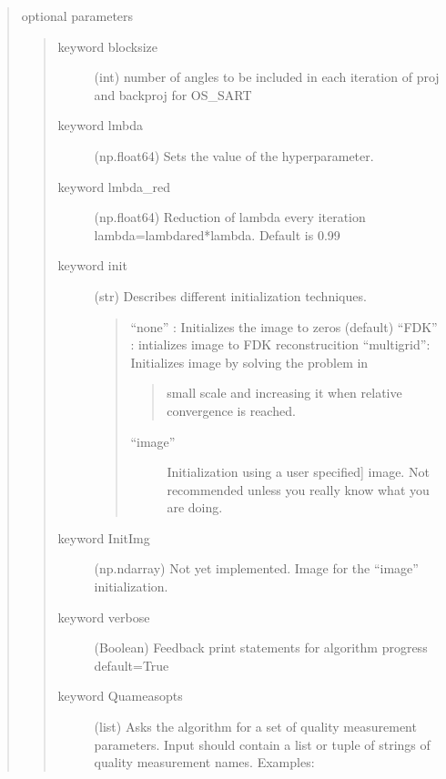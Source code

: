 \documentclass[letterpaper,10pt,english]{sphinxmanual}
\begin{document}
\begin{fulllineitems}
\begin{quote}
\begin{quote}
\begin{description}
\end{description}\end{quote}

optional parameters
\begin{quote}\begin{description}
\item[{keyword blocksize}] \leavevmode
(int)
number of angles to be included in each iteration
of proj and backproj for OS\_SART

\item[{keyword lmbda}] \leavevmode
(np.float64)
Sets the value of the hyperparameter.

\item[{keyword lmbda\_red}] \leavevmode
(np.float64)
Reduction of lambda every iteration
lambda=lambdared*lambda. Default is 0.99

\item[{keyword init}] \leavevmode
(str)
Describes different initialization techniques.
\begin{quote}

“none”     : Initializes the image to zeros (default)
“FDK”      : intializes image to FDK reconstrucition
“multigrid”: Initializes image by solving the problem in
\begin{quote}

small scale and increasing it when relative
convergence is reached.
\end{quote}
\begin{description}
\item[{“image”}] \leavevmode{[}Initialization using a user specified{]}
image. Not recommended unless you really
know what you are doing.

\end{description}
\end{quote}

\item[{keyword InitImg}] \leavevmode
(np.ndarray)
Not yet implemented. Image for the “image” initialization.

\item[{keyword verbose}] \leavevmode
(Boolean)
Feedback print statements for algorithm progress
default=True

\item[{keyword Quameasopts}] \leavevmode
(list)
Asks the algorithm for a set of quality measurement
parameters. Input should contain a list or tuple of strings of
quality measurement names. Examples:
\begin{quote}


\end{quote}
\end{description}
\end{quote}
\end{quote}
\end{fulllineitems}
\end{document}
